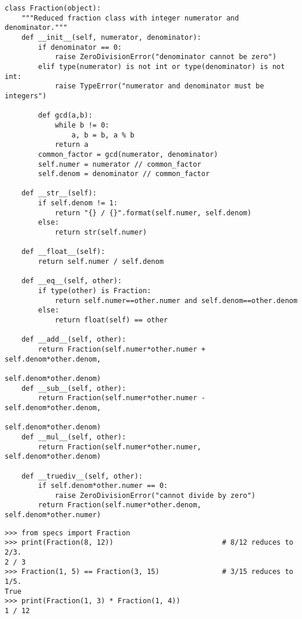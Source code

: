 \begin{lstlisting}
class Fraction(object):
    """Reduced fraction class with integer numerator and denominator."""
    def __init__(self, numerator, denominator):
        if denominator == 0:
            raise ZeroDivisionError("denominator cannot be zero")
        elif type(numerator) is not int or type(denominator) is not int:
            raise TypeError("numerator and denominator must be integers")

        def gcd(a,b):
            while b != 0:
                a, b = b, a % b
            return a
        common_factor = gcd(numerator, denominator)
        self.numer = numerator // common_factor
        self.denom = denominator // common_factor

    def __str__(self):
        if self.denom != 1:
            return "{} / {}".format(self.numer, self.denom)
        else:
            return str(self.numer)

    def __float__(self):
        return self.numer / self.denom

    def __eq__(self, other):
        if type(other) is Fraction:
            return self.numer==other.numer and self.denom==other.denom
        else:
            return float(self) == other

    def __add__(self, other):
        return Fraction(self.numer*other.numer + self.denom*other.denom,
                                                        self.denom*other.denom)
    def __sub__(self, other):
        return Fraction(self.numer*other.numer - self.denom*other.denom,
                                                        self.denom*other.denom)
    def __mul__(self, other):
        return Fraction(self.numer*other.numer, self.denom*other.denom)

    def __truediv__(self, other):
        if self.denom*other.numer == 0:
            raise ZeroDivisionError("cannot divide by zero")
        return Fraction(self.numer*other.denom, self.denom*other.numer)
\end{lstlisting}


\begin{lstlisting}
>>> from specs import Fraction
>>> print(Fraction(8, 12))                          # 8/12 reduces to 2/3.
2 / 3
>>> Fraction(1, 5) == Fraction(3, 15)               # 3/15 reduces to 1/5.
True
>>> print(Fraction(1, 3) * Fraction(1, 4))
1 / 12
\end{lstlisting}

